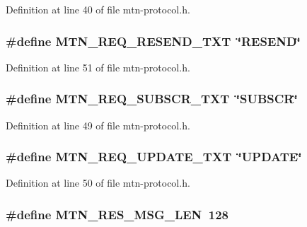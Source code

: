 Definition at line 40 of file mtn-\/protocol.h.

\hypertarget{mtn-protocol_8h_aaf4374213d7cfb5e00418861325e67e8}{
\subsubsection[{MTN\_\-REQ\_\-RESEND\_\-TXT}]{\setlength{\rightskip}{0pt plus 5cm}\#define MTN\_\-REQ\_\-RESEND\_\-TXT~\char`\"{}RESEND\char`\"{}}}
\label{mtn-protocol_8h_aaf4374213d7cfb5e00418861325e67e8}


Definition at line 51 of file mtn-\/protocol.h.

\hypertarget{mtn-protocol_8h_a80e112818318cea58e0724380104ae43}{
\subsubsection[{MTN\_\-REQ\_\-SUBSCR\_\-TXT}]{\setlength{\rightskip}{0pt plus 5cm}\#define MTN\_\-REQ\_\-SUBSCR\_\-TXT~\char`\"{}SUBSCR\char`\"{}}}
\label{mtn-protocol_8h_a80e112818318cea58e0724380104ae43}


Definition at line 49 of file mtn-\/protocol.h.

\hypertarget{mtn-protocol_8h_af89799e6a27d6b795bceaa5725f3ced4}{
\subsubsection[{MTN\_\-REQ\_\-UPDATE\_\-TXT}]{\setlength{\rightskip}{0pt plus 5cm}\#define MTN\_\-REQ\_\-UPDATE\_\-TXT~\char`\"{}UPDATE\char`\"{}}}
\label{mtn-protocol_8h_af89799e6a27d6b795bceaa5725f3ced4}


Definition at line 50 of file mtn-\/protocol.h.

\hypertarget{mtn-protocol_8h_a7fb87448607e65238cf0581c5eac7131}{
\subsubsection[{MTN\_\-RES\_\-MSG\_\-LEN}]{\setlength{\rightskip}{0pt plus 5cm}\#define MTN\_\-RES\_\-MSG\_\-LEN~128}}
\label{mtn-protocol_8h_a7fb87448607e65238cf0581c5eac7131}


